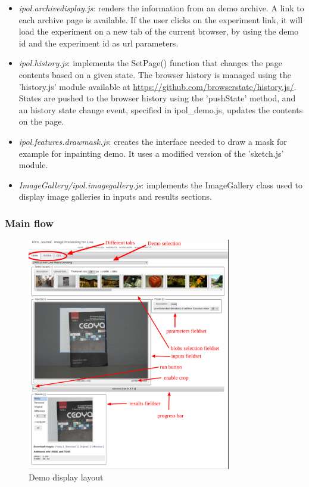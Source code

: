 \begin{itemize}
 \item \emph{ipol.archivedisplay.js}: renders the information from an demo archive.
  A link to each archive page is available. If the user clicks on the experiment
  link, it will load the experiment on a new tab of the current browser, by using
  the demo id and the experiment id as url parameters.

 \item \emph{ipol.history.js}: implements the SetPage() function that
  changes the page contents based on a given state. The browser history is 
  managed using the 'history.js' module available at 
  \url{https://github.com/browserstate/history.js/}.
  States are pushed to the browser history using the 'pushState' method, 
  and an history state change event, specified in ipol\_demo.js, updates
  the contents on the page.

 \item \emph{ipol.features.drawmask.js}: creates the interface needed to draw
  a mask for example for inpainting demo. It uses a modified version of the 'sketch.js' module.

  \item \emph{ImageGallery/ipol.imagegallery.js}: implements the ImageGallery class
  used to display image galleries in inputs and results sections.

\end{itemize}

\subsubsection{Main flow}

\begin{figure}[H]
  \centering
  \includegraphics[width=3.5in]{Images/demo_capture}
  \caption{Demo display layout}
  \label{img:demo_snapshot}
\end{figure}

